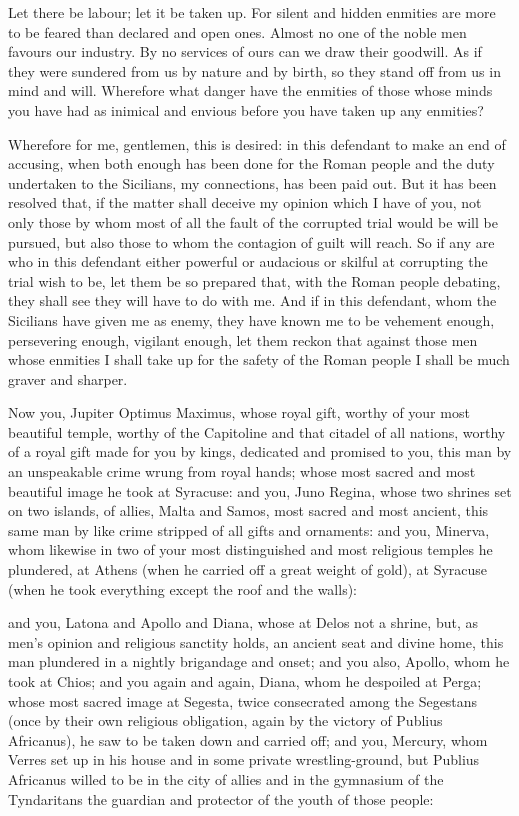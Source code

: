  Let there be labour; let it be taken up. For silent and hidden enmities are more to be feared than declared and open ones. Almost no one of the noble men favours our industry. By no services of ours can we draw their goodwill. As if they were sundered from us by nature and by birth, so they stand off from us in mind and will. Wherefore what danger have the enmities of those whose minds you have had as inimical and envious before you have taken up any enmities?

 Wherefore for me, gentlemen, this is desired: in this defendant to make an end of accusing, when both enough has been done for the Roman people and the duty undertaken to the Sicilians, my connections, has been paid out. But it has been resolved that, if the matter shall deceive my opinion which I have of you, not only those by whom most of all the fault of the corrupted trial would be will be pursued, but also those to whom the contagion of guilt will reach. So if any are who in this defendant either powerful or audacious or skilful at corrupting the trial wish to be, let them be so prepared that, with the Roman people debating, they shall see they will have to do with me. And if in this defendant, whom the Sicilians have given me as enemy, they have known me to be vehement enough, persevering enough, vigilant enough, let them reckon that against those men whose enmities I shall take up for the safety of the Roman people I shall be much graver and sharper.

 Now you, Jupiter Optimus Maximus, whose royal gift, worthy of your most beautiful temple, worthy of the Capitoline and that citadel of all nations, worthy of a royal gift made for you by kings, dedicated and promised to you, this man by an unspeakable crime wrung from royal hands; whose most sacred and most beautiful image he took at Syracuse: and you, Juno Regina, whose two shrines set on two islands, of allies, Malta and Samos, most sacred and most ancient, this same man by like crime stripped of all gifts and ornaments: and you, Minerva, whom likewise in two of your most distinguished and most religious temples he plundered, at Athens (when he carried off a great weight of gold), at Syracuse (when he took everything except the roof and the walls):

 and you, Latona and Apollo and Diana, whose at Delos not a shrine, but, as men's opinion and religious sanctity holds, an ancient seat and divine home, this man plundered in a nightly brigandage and onset; and you also, Apollo, whom he took at Chios; and you again and again, Diana, whom he despoiled at Perga; whose most sacred image at Segesta, twice consecrated among the Segestans (once by their own religious obligation, again by the victory of Publius Africanus), he saw to be taken down and carried off; and you, Mercury, whom Verres set up in his house and in some private wrestling-ground, but Publius Africanus willed to be in the city of allies and in the gymnasium of the Tyndaritans the guardian and protector of the youth of those people:

